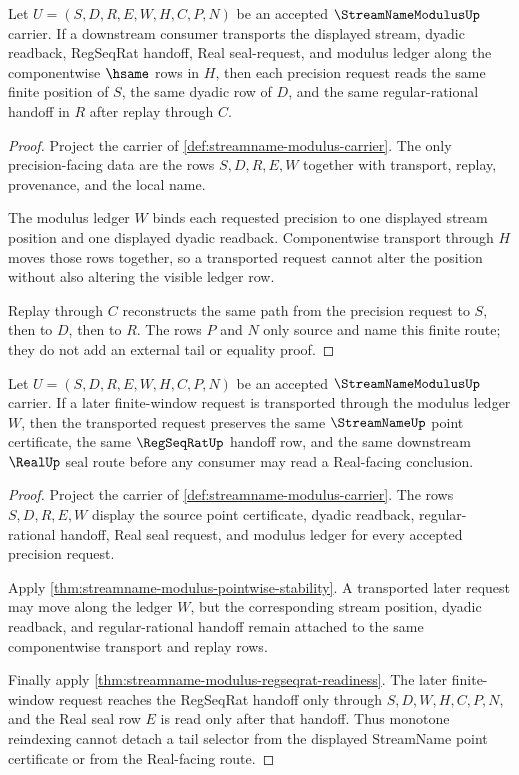 \begin{theorem}
\label{thm:streamname-modulus-pointwise-stability}
Let $U=(S,D,R,E,W,H,C,P,N)$ be an accepted $\StreamNameModulusUp$ carrier. If a
downstream consumer transports the displayed stream, dyadic readback, RegSeqRat
handoff, Real seal-request, and modulus ledger along the componentwise
$\hsame$ rows in $H$, then each precision request reads the same finite
position of $S$, the same dyadic row of $D$, and the same regular-rational
handoff in $R$ after replay through $C$.
\end{theorem}
\begin{proof}
Project the carrier of \autoref{def:streamname-modulus-carrier}. The only
precision-facing data are the rows $S,D,R,E,W$ together with transport,
replay, provenance, and the local name.

The modulus ledger $W$ binds each requested precision to one displayed stream
position and one displayed dyadic readback. Componentwise transport through
$H$ moves those rows together, so a transported request cannot alter the
position without also altering the visible ledger row.

Replay through $C$ reconstructs the same path from the precision request to
$S$, then to $D$, then to $R$. The rows $P$ and $N$ only source and name this
finite route; they do not add an external tail or equality proof.
\end{proof}

\begin{theorem}
\label{thm:streamname-modulus-monotone-reindex-stability}
Let $U=(S,D,R,E,W,H,C,P,N)$ be an accepted $\StreamNameModulusUp$ carrier. If a
later finite-window request is transported through the modulus ledger $W$, then
the transported request preserves the same $\StreamNameUp$ point certificate,
the same $\RegSeqRatUp$ handoff row, and the same downstream $\RealUp$ seal
route before any consumer may read a Real-facing conclusion.
\end{theorem}
\begin{proof}
Project the carrier of \autoref{def:streamname-modulus-carrier}. The rows
$S,D,R,E,W$ display the source point certificate, dyadic readback,
regular-rational handoff, Real seal request, and modulus ledger for every
accepted precision request.

Apply \autoref{thm:streamname-modulus-pointwise-stability}. A transported
later request may move along the ledger $W$, but the corresponding stream
position, dyadic readback, and regular-rational handoff remain attached to the
same componentwise transport and replay rows.

Finally apply \autoref{thm:streamname-modulus-regseqrat-readiness}. The later
finite-window request reaches the RegSeqRat handoff only through
$S,D,W,H,C,P,N$, and the Real seal row $E$ is read only after that handoff.
Thus monotone reindexing cannot detach a tail selector from the displayed
StreamName point certificate or from the Real-facing route.
\end{proof}

